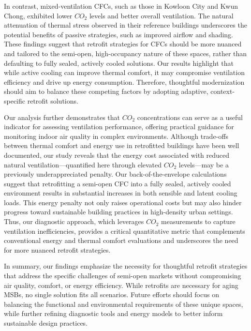 \documentclass[preprint,12pt]{elsarticle}
\begin{document}
In contrast, mixed-ventilation CFCs, such as those in Kowloon City and Kwun Chong, exhibited lower $CO_2$ levels and better overall ventilation. The natural attenuation of thermal stress observed in their reference buildings underscores the potential benefits of passive strategies, such as improved airflow and shading. These findings suggest that retrofit strategies for CFCs should be more nuanced and tailored to the semi-open, high-occupancy nature of these spaces, rather than defaulting to fully sealed, actively cooled solutions. Our results highlight that while active cooling can improve thermal comfort, it may compromise ventilation efficiency and drive up energy consumption. Therefore, thoughtful modernization should aim to balance these competing factors by adopting adaptive, context-specific retrofit solutions.

Our analysis further demonstrates that $CO_2$ concentrations can serve as a useful indicator for assessing ventilation performance, offering practical guidance for monitoring indoor air quality in complex environments. Although trade-offs between thermal comfort and energy use in retrofitted buildings have been well documented, our study reveals that the energy cost associated with reduced natural ventilation—quantified here through elevated $CO_2$ levels—may be a previously underappreciated penalty. Our back-of-the-envelope calculations suggest that retrofitting a semi-open CFC into a fully sealed, actively cooled environment results in substantial increases in both sensible and latent cooling loads. This energy penalty not only raises operational costs but may also hinder progress toward sustainable building practices in high-density urban settings. Thus, our diagnostic approach, which leverages $CO_2$ measurements to capture ventilation inefficiencies, provides a critical quantitative metric that complements conventional energy and thermal comfort evaluations and underscores the need for more nuanced retrofit strategies.

In summary, our findings emphasize the necessity for thoughtful retrofit strategies that address the specific challenges of semi-open markets without compromising air quality, comfort, or energy efficiency. While retrofits are necessary for aging MSBs, no single solution fits all scenarios. Future efforts should focus on balancing the functional and environmental requirements of these unique spaces, while further refining diagnostic tools and energy models to better inform sustainable design practices.
\end{document}
